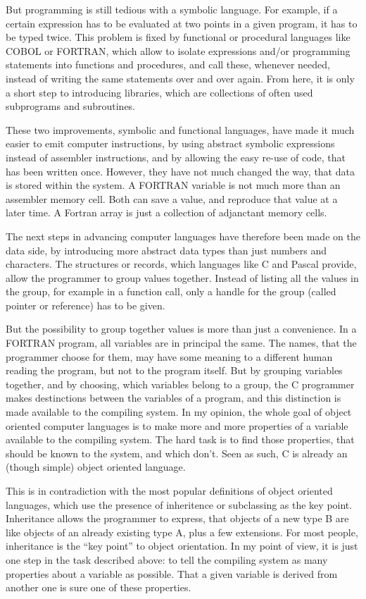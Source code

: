 But programming is still tedious with a symbolic language.  For
example, if a certain expression has to be evaluated at two
points in a given program, it has to be typed twice.  This
problem is fixed by functional or procedural languages like
COBOL or FORTRAN, which allow to isolate expressions and/or
programming statements into functions and procedures, and call
these, whenever needed, instead of writing the same statements
over and over again.  From here, it is only a short step to
introducing libraries, which are collections of often used
subprograms and subroutines.

These two improvements, symbolic and functional languages,
have made it much easier to emit computer instructions, by
using abstract symbolic expressions instead of assembler
instructions, and by allowing the easy re-use of code, that
has been written once.  However, they have not much changed
the way, that data is stored within the system.  A FORTRAN
variable is not much more than an assembler memory cell.  Both
can save a value, and reproduce that value at a later time.
A Fortran array is just a collection of adjanctant memory
cells.

The next steps in advancing computer languages have therefore
been made on the data side, by introducing more abstract data
types than just numbers and characters.  The structures or
records, which languages like C and Pascal provide, allow the
programmer to group values together.  Instead of listing all
the values in the group, for example in a function call, only
a handle for the group (called pointer or reference) has to
be given.

But the possibility to group together values is more than just
a convenience.  In a FORTRAN program, all variables are in
principal the same.  The names, that the programmer choose for
them, may have some meaning to a different human reading the
program, but not to the program itself.  But by grouping
variables together, and by choosing, which variables belong
to a group, the C programmer makes destinctions between the
variables of a program, and this distinction is made available
to the compiling system.  In my opinion, the whole goal of
object oriented computer languages is to make more and more
properties of a variable available to the compiling system.
The hard task is to find those properties, that should be known
to the system, and which don't.  Seen as such, C is already an
(though simple) object oriented language.

This is in contradiction with the most popular definitions of
object oriented languages, which use the presence of inheritence
or subclassing as the key point.  Inheritance allows the
programmer to express, that objects of a new type B are like
objects of an already existing type A, plus a few extensions.
For most people, inheritance is the ``key point'' to object
orientation.  In my point of view, it is just one step in the
task described above: to tell the compiling system as many
properties about a variable as possible.  That a given variable
is derived from another one is sure one of these properties.

